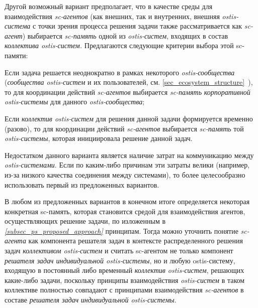 \begin{textitemize}
	\item Другой возможный вариант предполагает, что в качестве среды для взаимодействия \textit{sc-агентов} (как внешних, так и внутренних, внешняя \textit{ostis-система} с точки зрения процесса решения задачи также рассматривается как \textit{sc-агент}) выбирается \textit{sc-память} одной из \textit{ostis-систем}, входящих в состав \textit{коллектива ostis-систем.} Предлагаются следующие критерии выбора этой sc-памяти:
	\begin{textitemize}
		\item Если задача решается неоднократно в рамках некоторого \textit{ostis-сообщества} (\textit{сообщества ostis-систем} и их пользователей, см. \ref{sec_ecosystem_structure}~), то для координации действий \textit{sc-агентов} выбирается \textit{sc-память} \textit{корпоративной ostis-системы} для данного \textit{ostis-сообщества};
		\item Если \textit{коллектив ostis-систем} для решения данной задачи формируется временно (разово), то для координации действий \textit{sc-агентов} выбирается \textit{sc-память} той \textit{ostis-системы}, которая инициировала решение данной задач.
	\end{textitemize}
	\vspace{-\baselineskip}
	Недостатком данного варианта является наличие затрат на коммуникацию между \textit{ostis-системами}. Если по каким-либо причинам эти затраты велики (например, из-за низкого качества соединения между системами), то более целесообразно использовать первый из предложенных вариантов.
\end{textitemize}

В любом из предложенных вариантов в конечном итоге определяется некоторая конкретная sc-память, которая становится средой для взаимодействия агентов, осуществляющих решение задачи, по изложенным в \textit{\ref{subsec_ps_proposed_approach} } принципам. Тогда можно уточнить понятие \textit{sc-агента} как компонента решателя задач в контексте распределенного решения задач \textit{коллективом ostis-систем} и считать sc-агентом не только компонент \textit{решателя задач индивидуальной ostis-системы}, но и любую ostis-систему, входящую в постоянный либо временный \textit{коллектив ostis-систем}, решающих какие-либо задачи, поскольку принципы взаимодействия \textit{ostis-систем} в таком коллективе полностью совпадают с принципами взаимодействия \textit{sc-агентов} в составе \textit{решателя задач} \textit{индивидуальной ostis-системы}.

